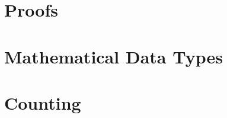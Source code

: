 \documentclass{mcs}
\begin{document}
\frontmatter

%

\mainmatter




\part{Proofs}







\part{Mathematical Data Types}
















\part{Counting}
\end{document}
